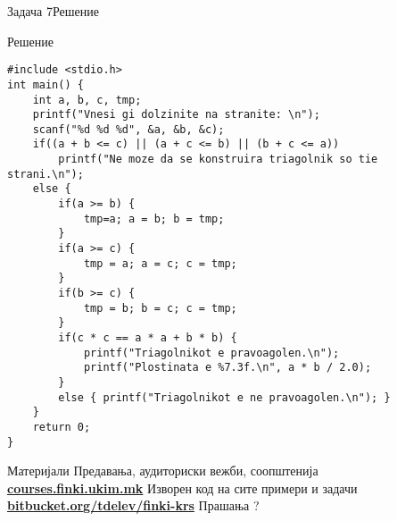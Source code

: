 \begin{frame}[fragile,shrink=30]{Задача 7}{Решение}
	\begin{exampleblock}{Решение}
		\begin{lstlisting}
#include <stdio.h> 
int main() {
    int a, b, c, tmp;
    printf("Vnesi gi dolzinite na stranite: \n");
    scanf("%d %d %d", &a, &b, &c);
    if((a + b <= c) || (a + c <= b) || (b + c <= a))
        printf("Ne moze da se konstruira triagolnik so tie strani.\n");
    else {
        if(a >= b) {
            tmp=a; a = b; b = tmp;
        }
        if(a >= c) {
            tmp = a; a = c; c = tmp;
        }
        if(b >= c) {
            tmp = b; b = c; c = tmp;
        }
        if(c * c == a * a + b * b) {
            printf("Triagolnikot e pravoagolen.\n");
            printf("Plostinata e %7.3f.\n", a * b / 2.0);
        }
        else { printf("Triagolnikot e ne pravoagolen.\n"); }
    }
    return 0;
}
		\end{lstlisting}
	\end{exampleblock}
\end{frame}

\begin{frame}{Материјали}{}
	Предавања, аудиториски вежби, соопштенија\\
	\href{http://courses.finki.ukim.mk/}{\textbf{courses.finki.ukim.mk}}
	\vfill
	Изворен код на сите примери и задачи\\
	\href{http://bitbucket.org/tdelev/finki-krs/}{\textbf{bitbucket.org/tdelev/finki-krs}}
	\vfill
	{\Huge Прашања ?}
\end{frame}


